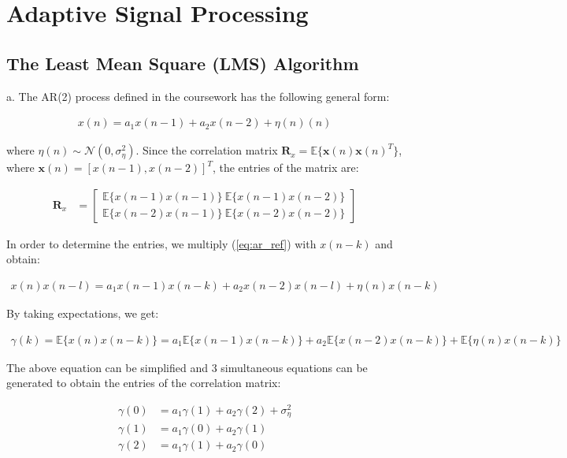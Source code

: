 \section{Adaptive Signal Processing}

\subsection{The Least Mean Square (LMS) Algorithm}

\noindent{}a. The AR(2) process defined in the coursework has the following general form:

\begin{align}
x(n) = a_1 x(n-1) + a_2 x(n-2) + \eta(n)(n) \label{eq:ar_ref}
\end{align}

\noindent{}where $\eta(n) \sim \mathcal{N}(0,\sigma_{\eta}^2)$. Since the correlation matrix $\textbf{R}_x = \mathbb{E}\{\textbf{x}(n)\textbf{x}(n)^T\}$, where $\textbf{x}(n)=[x(n-1), x(n-2)]^T$, the entries of the matrix are:

\begin{align*}
\textbf{R}_x &= 
\begin{bmatrix}
\mathbb{E}\{x(n-1)x(n-1)\} \ \mathbb{E}\{x(n-1)x(n-2)\} \\ 
\mathbb{E}\{x(n-2)x(n-1)\} \ \mathbb{E}\{x(n-2)x(n-2)\}
\end{bmatrix}
\end{align*} 

\noindent{}In order to determine the entries, we multiply (\ref{eq:ar_ref}) with $x(n-k)$ and obtain:

\begin{align*}
x(n)x(n-l) = a_1 x(n-1)x(n-k) + a_2 x(n-2)x(n-l) + \eta(n)x(n-k)
\end{align*}

\noindent{}By taking expectations, we get:

\begin{align*}
\gamma(k) = \mathbb{E}\{x(n)x(n-k)\} =  a_1 \mathbb{E}\{x(n-1)x(n-k)\} + a_2  \mathbb{E}\{x(n-2)x(n-k)\}  + \mathbb{E}\{\eta(n)x(n-k)\}
\end{align*}

\noindent{}The above equation can be simplified and 3 simultaneous equations can be generated to obtain the entries of the correlation matrix:

\begin{align*}
\gamma(0) &= a_1 \gamma(1) + a_2\gamma(2) + \sigma_{\eta}^2 \\
\gamma(1) &= a_1 \gamma(0) + a_2\gamma(1) \\
\gamma(2) &= a_1 \gamma(1) + a_2\gamma(0)
\end{align*}

